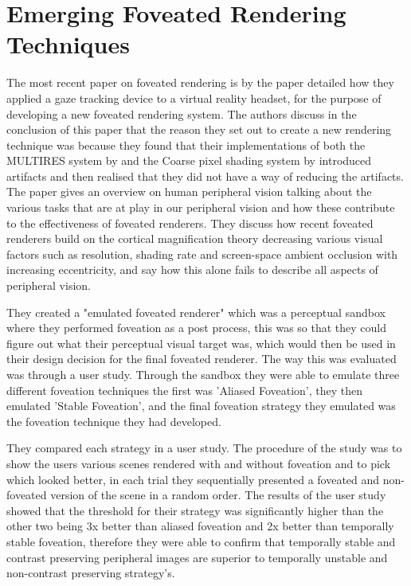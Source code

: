 \section{Emerging Foveated Rendering Techniques}
The most recent paper on foveated rendering is by \cite{Patney} the paper detailed how they applied a gaze tracking device to a virtual reality headset, for the purpose of developing a new foveated rendering system. The authors discuss in the conclusion of this paper that the reason they set out to create a new rendering technique was because they found that their implementations of both the MULTIRES system by \cite{Guenter:2012:FG:2366145.2366183} and the Coarse pixel shading system by  \cite{Vaidyanathan:2014:CPS:2980009.2980011} introduced artifacts and then realised that they did not have a way of reducing the artifacts. The paper gives an overview on human peripheral vision talking about the various tasks that are at play in our peripheral vision and how these contribute to the effectiveness of foveated renderers. They discuss how recent foveated renderers build on the cortical magnification theory decreasing various visual factors such as resolution, shading rate and screen-space ambient occlusion with increasing eccentricity, and say how this alone fails to describe all aspects of peripheral vision.

They created a "emulated foveated renderer" which was a perceptual sandbox where they performed foveation as a post process, this was so that they could figure out what their perceptual visual target was, which would then be used in their design decision for the final foveated renderer. The way this was evaluated was through a user study. Through the sandbox they were able to emulate three different foveation techniques the first was 'Aliased Foveation', they then emulated 'Stable Foveation', and the final foveation strategy they emulated was the foveation technique they had developed.

They compared each strategy in a user study. The procedure of the study was to show the users various scenes rendered with and without foveation and to pick which looked better, in each trial they sequentially presented a foveated and non-foveated version of the scene in a random order. The results of the user study showed that the threshold for their strategy was significantly higher than the other two being 3x better than aliased foveation and 2x better than temporally stable foveation, therefore they were able to confirm that temporally stable and contrast preserving peripheral images are superior to temporally unstable and non-contrast preserving strategy's. 

